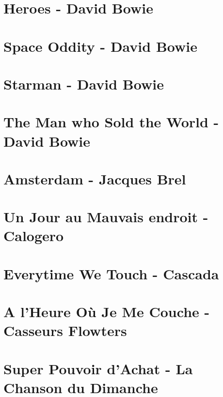 \documentclass[11pt]{article}
\begin{document}
\section{Heroes - David Bowie}


\section*{Space Oddity - David Bowie}
\section*{Starman - David Bowie}


\section*{The Man who Sold the World - David Bowie}



\section{Amsterdam - Jacques Brel}



\section{Un Jour au Mauvais endroit - Calogero}
\begin{guitar}

\end{guitar}

\section{Everytime We Touch - Cascada}


\section{A l'Heure Où Je Me Couche - Casseurs Flowters}
\begin{guitar}

\end{guitar}

\section{Super Pouvoir d'Achat - La Chanson du Dimanche}

\end{document}
